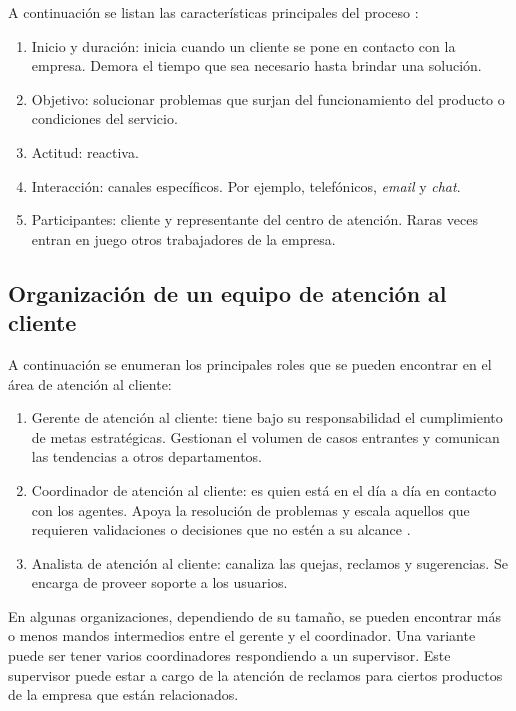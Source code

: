 A continuación se listan las características principales del proceso \citep{WEBSITE:3}:
\begin{enumerate}

\item Inicio y duración: inicia cuando un cliente se pone en contacto con la empresa. Demora el tiempo que sea necesario hasta brindar una solución.
\item Objetivo: solucionar problemas que surjan del funcionamiento del producto o condiciones del servicio.
\item Actitud: reactiva.
\item Interacción: canales específicos. Por ejemplo, telefónicos, \textit{email} y \textit{chat}.
\item Participantes: cliente y representante del centro de atención. Raras veces entran en juego otros trabajadores de la empresa.

\end{enumerate}

\subsection{Organización de un equipo de atención al cliente}

A continuación se enumeran los principales roles que se pueden encontrar en el área de atención al cliente:

\begin{enumerate}

\item Gerente de atención al cliente: tiene bajo su responsabilidad el cumplimiento de metas estratégicas. Gestionan el volumen de casos entrantes y comunican las tendencias a otros departamentos. \citep{WEBSITE:6}
\item Coordinador de atención al cliente: es quien está en el día a día en contacto con los agentes. Apoya la resolución de problemas y escala aquellos que requieren validaciones o decisiones que no estén a su alcance \citep{WEBSITE:5}.
\item Analista de atención al cliente: canaliza las quejas, reclamos y sugerencias. Se encarga de proveer soporte a los usuarios. \citep{WEBSITE:5}

\end{enumerate}

En algunas organizaciones, dependiendo de su tamaño, se pueden encontrar más o menos mandos intermedios entre el gerente y el coordinador. Una variante puede ser tener varios coordinadores respondiendo a un supervisor. Este supervisor puede estar a cargo de la atención de reclamos para ciertos productos de la empresa que están relacionados.

